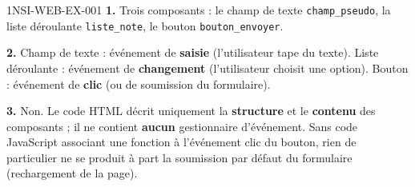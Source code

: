 \begin{corrige}{1NSI-WEB-EX-001}
\textbf{1.} Trois composants : le champ de texte \lstinline{champ_pseudo}, la liste
déroulante \lstinline{liste_note}, le bouton \lstinline{bouton_envoyer}.

\textbf{2.} Champ de texte : événement de \textbf{saisie} (l'utilisateur tape du texte).
Liste déroulante : événement de \textbf{changement} (l'utilisateur choisit une option).
Bouton : événement de \textbf{clic} (ou de soumission du formulaire).

\textbf{3.} Non. Le code HTML décrit uniquement la \textbf{structure} et le \textbf{contenu}
des composants ; il ne contient \textbf{aucun} gestionnaire d'événement. Sans code
JavaScript associant une fonction à l'événement clic du bouton, rien de particulier ne se
produit à part la soumission par défaut du formulaire (rechargement de la page).
\end{corrige}
